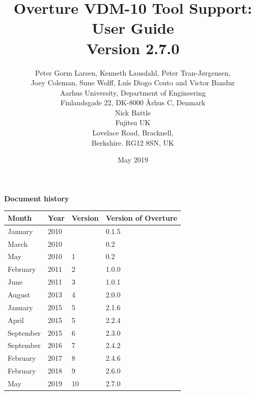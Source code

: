 \documentclass{overturerepchap}
\begin{document}
\title{Overture VDM-10 Tool Support: User Guide \\{\large Version 2.7.0}}
\author{Peter Gorm Larsen, Kenneth Lausdahl, Peter Tran-J\o{}rgensen,\\ Joey Coleman, Sune Wolff, Lu\'{i}s Diogo Couto and Victor Bandur\\
Aarhus University, Department of Engineering\\
Finlandsgade 22, DK-8000 \AA{}rhus C, Denmark\\[3mm]
Nick Battle\\
Fujitsu UK\\
Lovelace Road, Bracknell, \\
Berkshire. RG12 8SN, UK}

\date{May 2019}


\maketitle


\textbf{Document history}

\begin{tabular}{|l|l|l|l|}\hline
Month   & Year & Version & Version of Overture\\ \hline
January & 2010 &         & 0.1.5 \\ \hline
March   & 2010 &         & 0.2   \\ \hline
May     & 2010 & 1       & 0.2   \\ \hline
February& 2011 & 2       & 1.0.0   \\ \hline
June    & 2011 & 3       & 1.0.1   \\ \hline
August  & 2013 & 4       & 2.0.0 \\ \hline
January  & 2015 & 5       & 2.1.6 \\ \hline
April  & 2015 & 5       & 2.2.4 \\ \hline
September & 2015 & 6 & 2.3.0 \\ \hline
September & 2016 & 7 & 2.4.2 \\ \hline
February & 2017 & 8 & 2.4.6 \\ \hline
February & 2018 & 9 & 2.6.0 \\ \hline
May & 2019 & 10 & 2.7.0 \\ \hline
\end{tabular}

\tableofcontents
\end{document}
